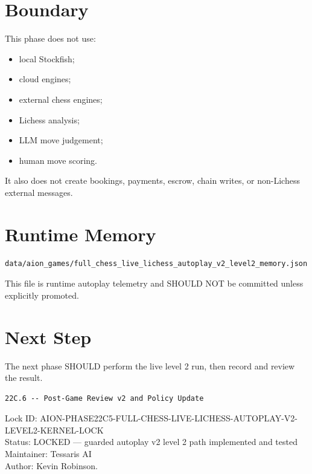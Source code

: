 \documentclass[11pt,a4paper]{article}
\begin{document}
\section{Boundary}

This phase does not use:

\begin{itemize}
  \item local Stockfish;
  \item cloud engines;
  \item external chess engines;
  \item Lichess analysis;
  \item LLM move judgement;
  \item human move scoring.
\end{itemize}

It also does not create bookings, payments, escrow, chain writes, or non-Lichess external messages.

\section{Runtime Memory}

\begin{verbatim}
data/aion_games/full_chess_live_lichess_autoplay_v2_level2_memory.json
\end{verbatim}

This file is runtime autoplay telemetry and SHOULD NOT be committed unless explicitly promoted.

\section{Next Step}

The next phase SHOULD perform the live level 2 run, then record and review the result.

\begin{verbatim}
22C.6 -- Post-Game Review v2 and Policy Update
\end{verbatim}

\bigskip

\noindent
Lock ID: AION-PHASE22C5-FULL-CHESS-LIVE-LICHESS-AUTOPLAY-V2-LEVEL2-KERNEL-LOCK\\
Status: LOCKED --- guarded autoplay v2 level 2 path implemented and tested\\
Maintainer: Tessaris AI\\
Author: Kevin Robinson.
\end{document}
